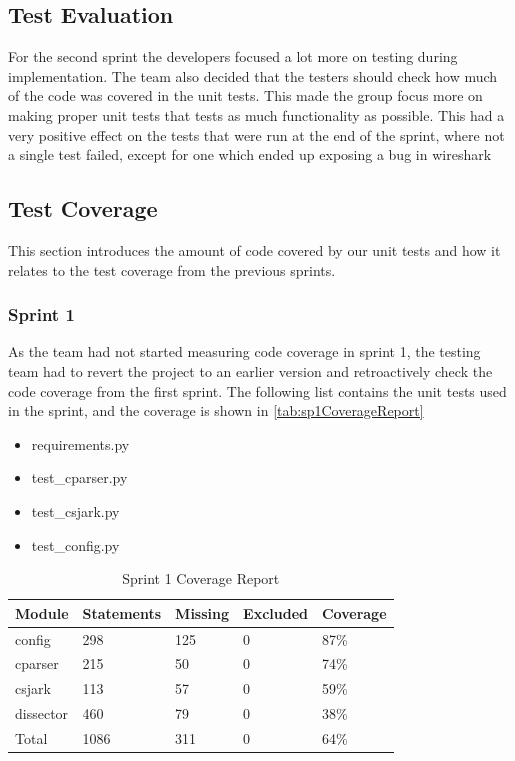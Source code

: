 \subsection{Test Evaluation}
For the second sprint the developers focused a lot more on testing during implementation. The team also decided that the testers should check how much of the code was covered in the unit tests. This made the group focus more on making proper unit tests that tests as much functionality as possible. This had a very positive effect on the tests that were run at the end of the sprint, where not a single test failed, except for one which ended up exposing a bug in \Gls{wireshark}

\subsection{Test Coverage}
This section introduces the amount of code covered by our unit tests and how it relates to the test coverage from the previous sprints.

\subsubsection{Sprint 1}
As the team had not started measuring code coverage in sprint 1, the testing team had to revert the project to an earlier version and retroactively check the code coverage from the first sprint. The following list contains the unit tests used in the sprint, and the coverage is shown in \autoref{tab:sp1CoverageReport}

\begin {itemize}
\item requirements.py
\item test\_cparser.py
\item test\_csjark.py
\item test\_config.py
\end{itemize}

\begin{table}[!htb]\footnotesize\center
	\caption{Sprint 1 Coverage Report\label{tab:sp1CoverageReport}}
	\begin{tabular}{l l l l l}
		\toprule
		Module & Statements & Missing & Excluded & Coverage\\
		\midrule
		config & 298 & 125 & 0 & 87\%\ \\
		cparser & 215 & 50 & 0 & 74\%\ \\
		csjark & 113 & 57 & 0 & 59\%\ \\
		\gls{dissector} & 460 & 79 & 0 & 38\%\ \\
		Total & 1086 & 311 & 0 & 64\%\ \\
		\bottomrule
	\end{tabular}
\end{table}

